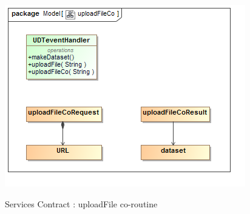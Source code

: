 \documentclass[a4paper,12pt]{article}
\begin{document}
	\begin{figure}[H]
		\includegraphics[width=\textwidth]{Images/uploadFileCo.png}  \\
		\caption{Services Contract : uploadFile co-routine}
	\end{figure}
	
\end{document}
